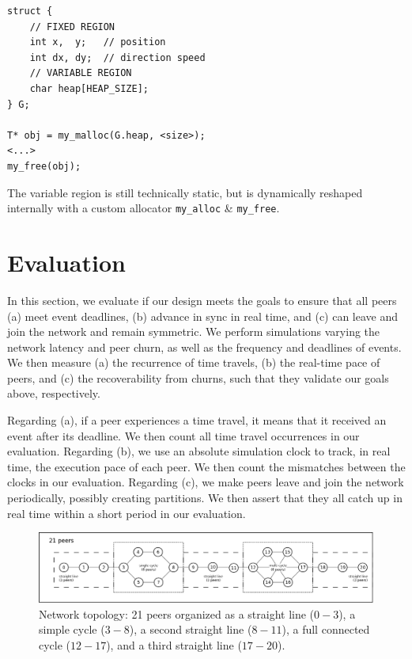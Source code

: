 \documentclass[fleqn,10pt]{SelfArx}
\newcommand{\code}[1]  {\texttt{\footnotesize{#1}}}
\begin{document}
{\footnotesize
\begin{verbatim}
struct {
    // FIXED REGION
    int x,  y;   // position
    int dx, dy;  // direction speed
    // VARIABLE REGION
    char heap[HEAP_SIZE];
} G;

T* obj = my_malloc(G.heap, <size>);
<...>
my_free(obj);
\end{verbatim}
}

The variable region is still technically static, but is dynamically reshaped
internally with a custom allocator \code{my\_alloc} \& \code{my\_free}.

\section{Evaluation}
\label{sec.eval}

In this section, we evaluate if our design meets the goals to ensure that all
peers
    (a) meet event deadlines,
    (b) advance in sync in real time, and
    (c) can leave and join the network and remain symmetric.
%
We perform simulations varying the network latency and peer churn, as well as
the frequency and deadlines of events.
%
We then measure
    (a) the recurrence of time travels,
    (b) the real-time pace of peers, and
    (c) the recoverability from churns,
such that they validate our goals above, respectively.

Regarding (a), if a peer experiences a time travel, it means that it received
an event after its deadline.
We then count all time travel occurrences in our evaluation.
%
Regarding (b), we use an absolute simulation clock to track, in real time, the
execution pace of each peer.
We then count the mismatches between the clocks in our evaluation.
%
Regarding (c), we make peers leave and join the network periodically, possibly
creating partitions.
We then assert that they all catch up in real time within a short period in our
evaluation.

\begin{figure}
  \centering
  \includegraphics[width=\linewidth]{topo}
  \caption{
    \label{fig.topo}
    Network topology: 21 peers organized as a straight line ($0-3$), a simple
    cycle ($3-8$), a second straight line ($8-11$), a full connected cycle
    ($12-17$), and a third straight line ($17-20$).
  }
\end{figure}
\end{document}
